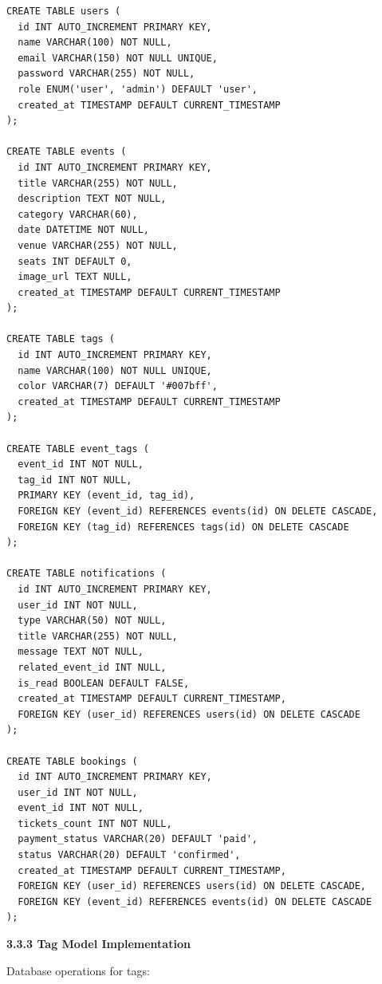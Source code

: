 \documentclass[12pt]{report}
\begin{document}
\begin{lstlisting}
CREATE TABLE users (
  id INT AUTO_INCREMENT PRIMARY KEY,
  name VARCHAR(100) NOT NULL,
  email VARCHAR(150) NOT NULL UNIQUE,
  password VARCHAR(255) NOT NULL,
  role ENUM('user', 'admin') DEFAULT 'user',
  created_at TIMESTAMP DEFAULT CURRENT_TIMESTAMP
);

CREATE TABLE events (
  id INT AUTO_INCREMENT PRIMARY KEY,
  title VARCHAR(255) NOT NULL,
  description TEXT NOT NULL,
  category VARCHAR(60),
  date DATETIME NOT NULL,
  venue VARCHAR(255) NOT NULL,
  seats INT DEFAULT 0,
  image_url TEXT NULL,
  created_at TIMESTAMP DEFAULT CURRENT_TIMESTAMP
);

CREATE TABLE tags (
  id INT AUTO_INCREMENT PRIMARY KEY,
  name VARCHAR(100) NOT NULL UNIQUE,
  color VARCHAR(7) DEFAULT '#007bff',
  created_at TIMESTAMP DEFAULT CURRENT_TIMESTAMP
);

CREATE TABLE event_tags (
  event_id INT NOT NULL,
  tag_id INT NOT NULL,
  PRIMARY KEY (event_id, tag_id),
  FOREIGN KEY (event_id) REFERENCES events(id) ON DELETE CASCADE,
  FOREIGN KEY (tag_id) REFERENCES tags(id) ON DELETE CASCADE
);

CREATE TABLE notifications (
  id INT AUTO_INCREMENT PRIMARY KEY,
  user_id INT NOT NULL,
  type VARCHAR(50) NOT NULL,
  title VARCHAR(255) NOT NULL,
  message TEXT NOT NULL,
  related_event_id INT NULL,
  is_read BOOLEAN DEFAULT FALSE,
  created_at TIMESTAMP DEFAULT CURRENT_TIMESTAMP,
  FOREIGN KEY (user_id) REFERENCES users(id) ON DELETE CASCADE
);

CREATE TABLE bookings (
  id INT AUTO_INCREMENT PRIMARY KEY,
  user_id INT NOT NULL,
  event_id INT NOT NULL,
  tickets_count INT NOT NULL,
  payment_status VARCHAR(20) DEFAULT 'paid',
  status VARCHAR(20) DEFAULT 'confirmed',
  created_at TIMESTAMP DEFAULT CURRENT_TIMESTAMP,
  FOREIGN KEY (user_id) REFERENCES users(id) ON DELETE CASCADE,
  FOREIGN KEY (event_id) REFERENCES events(id) ON DELETE CASCADE
);
\end{lstlisting}

\textbf{3.3.3 Tag Model Implementation}

Database operations for tags:
\end{document}
